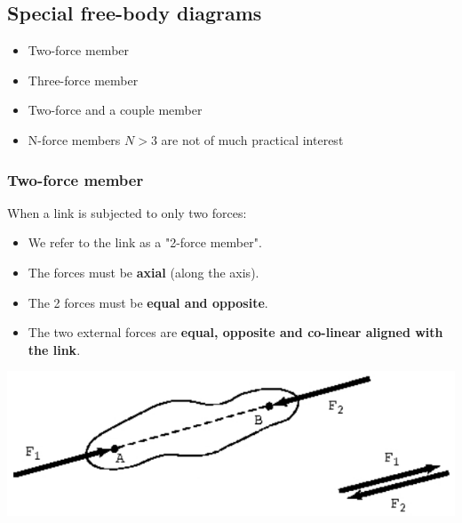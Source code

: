 \documentclass[11pt]{article}
\begin{document}
\subsection{Special free-body diagrams}
\label{sec:orgfa2cd9a}
\begin{itemize}
\item Two-force member
\item Three-force member
\item Two-force and a couple member
\item N-force members \(N > 3\) are not of much practical interest
\end{itemize}
\subsubsection{Two-force member}
\label{sec:orgdea1235}
When a link is subjected to only two forces:
\begin{itemize}
\item We refer to the link as a "2-force member".
\item The forces must be \textbf{axial} (along the axis).
\item The 2 forces must be \textbf{equal and opposite}.
\item The two external forces are \textbf{equal, opposite and co-linear aligned with the link}.
\end{itemize}

\begin{center}
\includegraphics[width=.9\linewidth]{./images/free-body-diagram-two-force-member.png}
\end{center}
\end{document}
